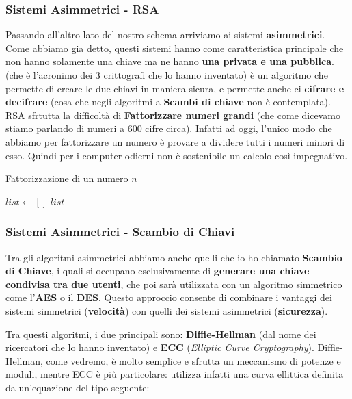 \documentclass{rapport}
\begin{document}
\subsubsection{Sistemi Asimmetrici - RSA}

Passando all'altro lato del nostro schema arriviamo ai sistemi \textbf{asimmetrici}. Come abbiamo gia detto, questi sistemi hanno come caratteristica principale che non hanno solamente una chiave ma ne hanno \textbf{una privata e una pubblica}.  (che è l'acronimo dei 3 crittografi che lo hanno inventato) è un algoritmo che permette di creare le due chiavi in maniera sicura, e permette anche ci \textbf{cifrare e decifrare} (cosa che negli algoritmi a \textbf{Scambi di chiave} non è contemplata). RSA sfrtutta la difficoltà di \textbf{Fattorizzare numeri grandi} (che come dicevamo stiamo parlando di numeri a 600 cifre circa). Infatti ad oggi, l'unico modo che abbiamo per fattorizzare un numero è provare a dividere tutti i numeri minori di esso. Quindi per i computer odierni non è sostenibile un calcolo così impegnativo.  

\vspace{0.5cm}


\begin{algorithm}[H]
\caption{Fattorizzazione di un numero $n$}
$list \gets []$\;
\Return $list$\;
\end{algorithm}


\newpage

\subsubsection{Sistemi Asimmetrici - Scambio di Chiavi}
Tra gli algoritmi asimmetrici abbiamo anche quelli che io ho chiamato \textbf{Scambio di Chiave}, i quali si occupano esclusivamente di \textbf{generare una chiave condivisa tra due utenti}, che poi sarà utilizzata con un algoritmo simmetrico come l'\textbf{AES} o il \textbf{DES}. Questo approccio consente di combinare i vantaggi dei sistemi simmetrici (\textbf{velocità}) con quelli dei sistemi asimmetrici (\textbf{sicurezza}).


Tra questi algoritmi, i due principali sono: \textbf{Diffie-Hellman} (dal nome dei ricercatori che lo hanno inventato) e \textbf{ECC} (\textit{Elliptic Curve Cryptography}). Diffie-Hellman, come vedremo, è molto semplice e sfrutta un meccanismo di potenze e moduli, mentre ECC è più particolare: utilizza infatti una curva ellittica definita da un’equazione del tipo seguente:
\end{document}
